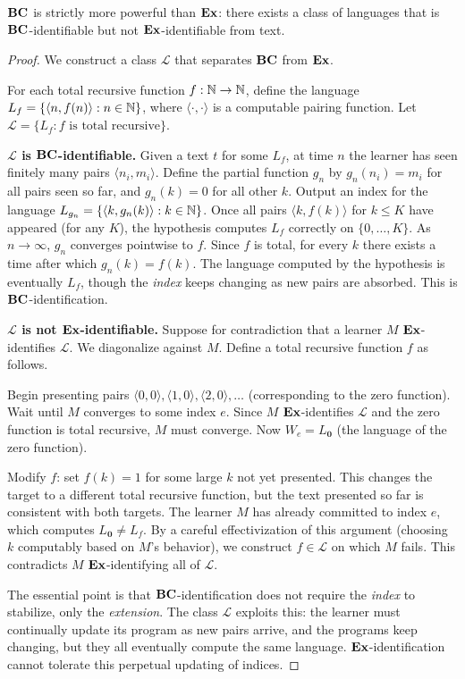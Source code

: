 \begin{thm}
\label{thm:bc-strictly-stronger}
$\mathbf{BC}$ is strictly more powerful than $\mathbf{Ex}$: there exists a class of languages that is $\mathbf{BC}$-identifiable but not $\mathbf{Ex}$-identifiable from text.
\end{thm}

\begin{proof}
We construct a class $\mathcal{L}$ that separates $\mathbf{BC}$ from $\mathbf{Ex}$.

For each total recursive function $f : \mathbb{N} \to \mathbb{N}$, define the language $L_f = \{\langle n, f(n)\rangle : n \in \mathbb{N}\}$, where $\langle \cdot, \cdot \rangle$ is a computable pairing function. Let $\mathcal{L} = \{L_f : f \text{ is total recursive}\}$.

\medskip\noindent\textbf{$\mathcal{L}$ is $\mathbf{BC}$-identifiable.} Given a text $t$ for some $L_f$, at time $n$ the learner has seen finitely many pairs $\langle n_i, m_i\rangle$. Define the partial function $g_n$ by $g_n(n_i) = m_i$ for all pairs seen so far, and $g_n(k) = 0$ for all other $k$. Output an index for the language $L_{g_n} = \{\langle k, g_n(k)\rangle : k \in \mathbb{N}\}$. Once all pairs $\langle k, f(k)\rangle$ for $k \leq K$ have appeared (for any $K$), the hypothesis computes $L_f$ correctly on $\{0, \ldots, K\}$. As $n \to \infty$, $g_n$ converges pointwise to $f$. Since $f$ is total, for every $k$ there exists a time after which $g_n(k) = f(k)$. The language computed by the hypothesis is eventually $L_f$, though the \emph{index} keeps changing as new pairs are absorbed. This is $\mathbf{BC}$-identification.

\medskip\noindent\textbf{$\mathcal{L}$ is not $\mathbf{Ex}$-identifiable.} Suppose for contradiction that a learner $M$ $\mathbf{Ex}$-identifies $\mathcal{L}$. We diagonalize against $M$. Define a total recursive function $f$ as follows.

Begin presenting pairs $\langle 0, 0\rangle, \langle 1, 0\rangle, \langle 2, 0\rangle, \ldots$ (corresponding to the zero function). Wait until $M$ converges to some index $e$. Since $M$ $\mathbf{Ex}$-identifies $\mathcal{L}$ and the zero function is total recursive, $M$ must converge. Now $W_e = L_{\mathbf{0}}$ (the language of the zero function).

Modify $f$: set $f(k) = 1$ for some large $k$ not yet presented. This changes the target to a different total recursive function, but the text presented so far is consistent with both targets. The learner $M$ has already committed to index $e$, which computes $L_{\mathbf{0}} \neq L_f$. By a careful effectivization of this argument (choosing $k$ computably based on $M$'s behavior), we construct $f \in \mathcal{L}$ on which $M$ fails. This contradicts $M$ $\mathbf{Ex}$-identifying all of $\mathcal{L}$.

The essential point is that $\mathbf{BC}$-identification does not require the \emph{index} to stabilize, only the \emph{extension}. The class $\mathcal{L}$ exploits this: the learner must continually update its program as new pairs arrive, and the programs keep changing, but they all eventually compute the same language. $\mathbf{Ex}$-identification cannot tolerate this perpetual updating of indices.
\end{proof}

